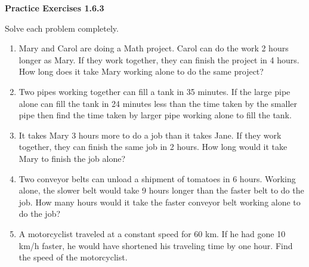 \vspace{1ex}
\noindent\textbf{Practice Exercises 1.6.3}

\vspace{0.75ex}

Solve each problem completely.

\begin{enumerate}[label = \color{blue}\arabic*. ]
\item Mary and Carol are doing a Math project. Carol can do the work 2 hours longer 
as Mary. If they work together, they can finish the project in 4 hours. How long 
does it take Mary working alone to do the same project?
\item Two pipes working together can fill a tank in 35 minutes. If the large pipe alone can fill the tank in 24 minutes less than the time taken by the smaller pipe then find the time taken by larger pipe working alone to fill the tank.
\item It takes Mary 3 hours more to do a job than it takes Jane. If they work together, they can finish the same job in 2 hours. How long would it take Mary to finish the job alone?
\item Two conveyor belts can unload a shipment of tomatoes in 6 hours. Working alone, the slower belt would take 9 hours longer than the faster belt to do the job. How many hours would it take the faster conveyor belt working alone to do the job?
\item A motorcyclist traveled at a constant speed for 60 km. If he had gone 10 km/h faster, he would have shortened his traveling time by one hour. Find the speed of the motorcyclist.
\end{enumerate}
